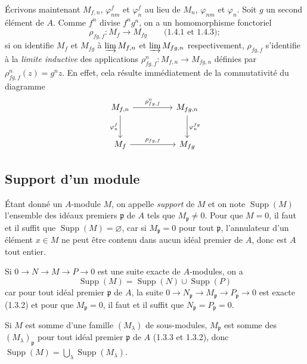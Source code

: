 \begin{env}[1.6.2]
\label{0.1.6.2-fr}
Écrivons maintenant $M_{f,n}$, $\varphi_{nm}^f$ et $\varphi_n^f$ au lieu de
$M_n$, $\varphi_{nm}$ et $\varphi_n$. Soit $g$ un second élément de $A$. Comme
$f^n$ divise $f^ng^n$, on a un homomorphisme fonctoriel
\[
  \rho_{fg,f}:M_f\longrightarrow M_{fg}\qquad\text{(1.4.1 et 1.4.3)};
\]
si on identifie $M_f$ et $M_{fg}$ à $\varinjlim M_{f,n}$ et
$\varinjlim M_{fg,n}$ respectivement, $\rho_{fg,f}$ s'identifie à la
\emph{limite inductive} des applications
$\rho_{fg,f}^n:M_{f,n}\to M_{fg,n}$ définies par
$\rho_{fg,f}^n(z)=g^nz$. En effet, cela résulte immédiatement de la
commutativité du diagramme
\[
\begin{tikzcd}[column sep=huge,row sep=large]
M_{f,n} \arrow[r,"\rho_{fg,f}^n"] \arrow[d,"\varphi_n^f"']
  & M_{fg,n} \arrow[d,"\varphi_n^{fg}"] \\
M_f \arrow[r,"\rho_{fg,f}"]
  & M_{fg}
\end{tikzcd}
\]
\end{env}

\subsection{Support d'un module}
\label{subsection:0.1.7-fr}

\begin{env}[1.7.1]
\label{0.1.7.1-fr}
Étant donné un $A$-module $M$, on appelle \emph{support} de $M$ et on note
$\operatorname{Supp}(M)$ l'ensemble des idéaux premiers $\mathfrak p$ de $A$
tels que $M_{\mathfrak p}\neq0$. Pour que $M=0$, il faut et il suffit que
$\operatorname{Supp}(M)=\varnothing$, car si $M_{\mathfrak p}=0$ pour tout
$\mathfrak p$, l'annulateur d'un élément $x\in M$ ne peut être contenu dans
aucun idéal premier de $A$, donc est $A$ tout entier.
\end{env}

\begin{env}[1.7.2]
\label{0.1.7.2-fr}
Si $0\to N\to M\to P\to0$ est une suite exacte de $A$-modules, on a
\[
  \operatorname{Supp}(M)=\operatorname{Supp}(N)\cup\operatorname{Supp}(P)
\]
car pour tout idéal premier $\mathfrak p$ de $A$, la suite
$0\to N_{\mathfrak p}\to M_{\mathfrak p}\to P_{\mathfrak p}\to0$ est exacte
(1.3.2) et pour que $M_{\mathfrak p}=0$, il faut et il suffit que
$N_{\mathfrak p}=P_{\mathfrak p}=0$.
\end{env}

\begin{env}[1.7.3]
\label{0.1.7.3-fr}
Si $M$ est somme d'une famille $(M_\lambda)$ de sous-modules,
$M_{\mathfrak p}$ est somme des $(M_\lambda)_{\mathfrak p}$ pour tout idéal
premier $\mathfrak p$ de $A$ (1.3.3 et 1.3.2), donc
$\operatorname{Supp}(M)=\bigcup_\lambda\operatorname{Supp}(M_\lambda)$.
\end{env}

